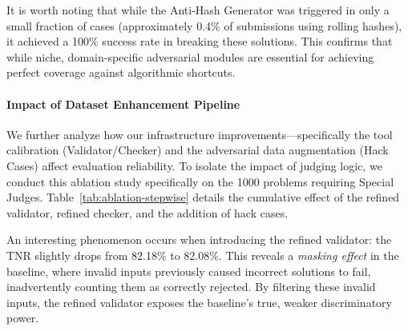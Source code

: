 \documentclass[11pt]{article}
\begin{document}
It is worth noting that while the Anti-Hash Generator was triggered in only a small fraction of cases (approximately 0.4\% of submissions using rolling hashes), it achieved a 100\% success rate in breaking these solutions. This confirms that while niche, domain-specific adversarial modules are essential for achieving perfect coverage against algorithmic shortcuts.

\paragraph{Impact of Dataset Enhancement Pipeline}
We further analyze how our infrastructure improvements—specifically the tool calibration (Validator/Checker) and the adversarial data augmentation (Hack Cases) affect evaluation reliability. To isolate the impact of judging logic, we conduct this ablation study specifically on the 1000 problems requiring Special Judges. Table~\ref{tab:ablation-stepwise} details the cumulative effect of the refined validator, refined checker, and the addition of hack cases.

\begin{table}[h]
\centering
{}
\caption{Stepwise analysis of the dataset enhancement pipeline on Special Judge problems. Adding adversarial Hack Cases provides the decisive boost to TNR.}
\label{tab:ablation-stepwise}
\vspace{-0.3cm}
\end{table}

An interesting phenomenon occurs when introducing the refined validator: the TNR slightly drops from 82.18\% to 82.08\%. This reveals a \textit{masking effect} in the baseline, where invalid inputs previously caused incorrect solutions to fail, inadvertently counting them as correctly rejected. By filtering these invalid inputs, the refined validator exposes the baseline's true, weaker discriminatory power.
\end{document}
